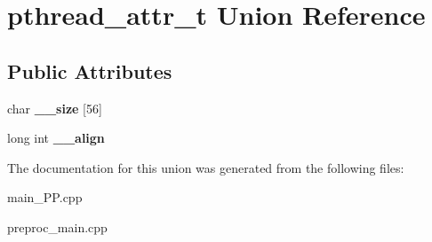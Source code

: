 \hypertarget{unionpthread__attr__t}{\section{pthread\+\_\+attr\+\_\+t Union Reference}
\label{unionpthread__attr__t}
}
\subsection*{Public Attributes}
\begin{DoxyCompactItemize}
\item 
\hypertarget{unionpthread__attr__t_a7548e14eb53b54bdd4fab49a97076b16}{char {\bfseries \+\_\+\+\_\+size} \mbox{[}56\mbox{]}}\label{unionpthread__attr__t_a7548e14eb53b54bdd4fab49a97076b16}

\item 
\hypertarget{unionpthread__attr__t_a95e7355fcfcc161aabfb6b5d8f4e19cd}{long int {\bfseries \+\_\+\+\_\+align}}\label{unionpthread__attr__t_a95e7355fcfcc161aabfb6b5d8f4e19cd}

\end{DoxyCompactItemize}


The documentation for this union was generated from the following files\+:\begin{DoxyCompactItemize}
\item 
main\+\_\+\+P\+P.\+cpp\item 
preproc\+\_\+main.\+cpp\end{DoxyCompactItemize}
